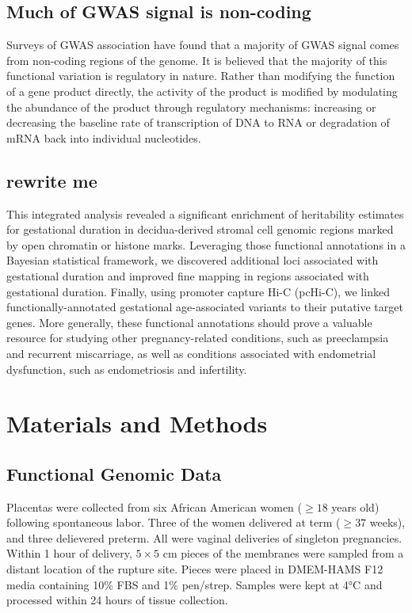 \subsection{Much of GWAS signal is non-coding}\label{sec:org3ac0b01}

Surveys of GWAS association have found that a majority of GWAS signal comes from non-coding regions of the genome.  It is believed that the majority 
of this functional variation is regulatory in nature.  Rather than modifying the function of a gene product directly, the activity of the product is modified
by modulating the abundance of the product through regulatory mechanisms: increasing or decreasing the baseline rate of transcription of DNA to RNA or degradation of mRNA back into individual nucleotides.  


\subsection{rewrite me}
This integrated analysis revealed a significant enrichment of heritability estimates for gestational duration in decidua-derived stromal cell genomic regions marked by open chromatin or histone marks. Leveraging those functional annotations in a Bayesian statistical framework, we discovered additional loci associated with gestational duration and improved fine mapping in regions associated with gestational duration. Finally, using promoter capture Hi-C (pcHi-C), we linked functionally-annotated gestational age-associated variants to their putative target genes. More generally, these functional annotations should prove a valuable resource for studying other pregnancy-related conditions, such as preeclampsia and recurrent miscarriage, as well as conditions associated with endometrial dysfunction, such as endometriosis and infertility. 

\section{Materials and Methods}\label{sec:org39326e2}

\subsection{Functional Genomic Data}\label{sec:org702e301}
  
Placentas were collected from six African American women (\(\geq 18\) years old) following spontaneous labor.
Three of the women delivered at term (\(\geq 37\) weeks), and three delievered preterm.
All were vaginal deliveries of singleton pregnancies. Within 1 hour of delivery, $5 \times 5$ cm pieces of the membranes were
sampled from a distant location of the rupture site. Pieces were placed in DMEM-HAMS F12 media containing 10\% FBS and
1\% pen/strep. Samples were kept at 4°C and processed within 24 hours of tissue collection.

